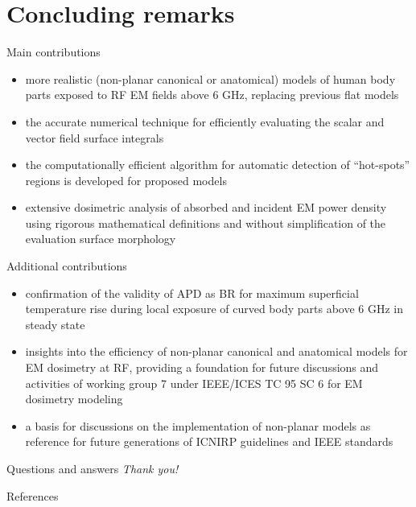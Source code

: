 \documentclass[xcolor=dvipsnames,10pt]{beamer}
\begin{document}
\section[Concluding remarks]{Concluding remarks}

\begin{frame}{Main contributions}
    \begin{itemize}
        \item more realistic (non-planar canonical or anatomical) models of human body parts exposed to RF EM fields above 6 GHz, replacing previous flat models
        \item the accurate numerical technique for efficiently evaluating the scalar and vector field surface integrals
        \item the computationally efficient algorithm for automatic detection of ``hot-spots'' regions is developed for proposed models
        \item extensive dosimetric analysis of absorbed and incident EM power density using rigorous mathematical definitions and without simplification of the evaluation surface morphology
    \end{itemize}
\end{frame}

\begin{frame}{Additional contributions}
    \begin{itemize}
        \item confirmation of the validity of APD as BR for maximum superficial temperature rise during local exposure of curved body parts above 6 GHz in steady state
        \item insights into the efficiency of non-planar canonical and anatomical models for EM dosimetry at RF, providing a foundation for future discussions and activities of working group 7 under IEEE/ICES TC 95 SC 6 for EM dosimetry modeling
        \item a basis for discussions on the implementation of non-planar models as reference for future generations of ICNIRP guidelines and IEEE standards
    \end{itemize}
\end{frame}

\begin{frame}{Questions and answers}
    \centering \LARGE \emph{Thank you!}
\end{frame}

\begin{frame}[allowframebreaks]{References}
  \printbibliography[heading=none]
\end{frame}
\end{document}
